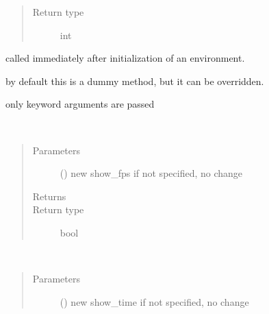 \documentclass[letterpaper,10pt,english]{sphinxmanual}
\begin{document}
\begin{fulllineitems}
\begin{fulllineitems}
\begin{quote}
\begin{description}
\item[{Return type}] \leavevmode
int

\end{description}\end{quote}

\end{fulllineitems}


\begin{fulllineitems}
\label{\detokenize{Reference:salabim.Environment.setup}}
called immediately after initialization of an environment.

by default this is a dummy method, but it can be overridden.

only keyword arguments are passed

\end{fulllineitems}


\begin{fulllineitems}
\label{\detokenize{Reference:salabim.Environment.show_fps}}~\begin{quote}\begin{description}
\item[{Parameters}] \leavevmode
{} () \textendash{} new show\_fps 
if not specified, no change

\item[{Returns}] \leavevmode
{}

\item[{Return type}] \leavevmode
bool

\end{description}\end{quote}

\end{fulllineitems}


\begin{fulllineitems}
\label{\detokenize{Reference:salabim.Environment.show_time}}~\begin{quote}\begin{description}
\item[{Parameters}] \leavevmode
{} () \textendash{} new show\_time 
if not specified, no change


\end{description}
\end{quote}
\end{fulllineitems}
\end{fulllineitems}
\end{document}
